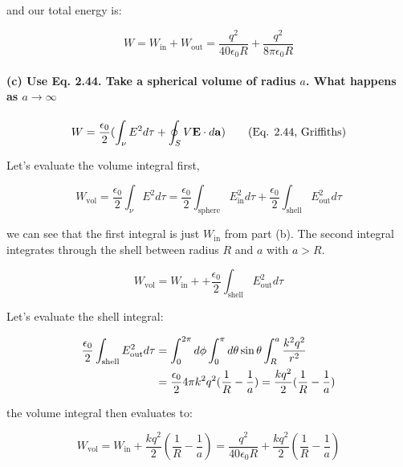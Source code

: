 \documentclass{article}
\numberwithin{equation}{section}
\numberwithin{figure}{section}
\begin{document}
and our total energy is:

\begin{equation}
    W = W_\text{in} + W_\text{out} = \frac{q^2}{40 \epsilon_0 R}+ \frac{q^2}{8 \pi \epsilon_0 R }
\end{equation}

\paragraph{(c) Use Eq. 2.44. Take a spherical volume of radius $a$. What happens as $a \to \infty$}

\begin{equation*}
    W = {\epsilon_0 \over 2} ( \int_\nu E^2 d \tau + \oint_S V \vb E \cdot d \vb a ) \tag{Eq. 2.44, Griffiths}  
\end{equation*}

Let's evaluate the volume integral first,

\begin{equation}
    W_{\text{vol}} = \frac{\epsilon_0}{2} \int_\nu E^2 d \tau = \frac{\epsilon_0}{2} \int_\text{sphere} E_\text{in}^2 d \tau + \frac{\epsilon_0}{2} \int_\text{shell} E_\text{out}^2 d \tau
\end{equation}

we can see that the first integral is just $W_\text{in}$ from part (b). The second integral integrates through the shell between radius $R$ and $a$ with $a > R$.

\begin{equation}
    W_{\text{vol}} = W_\text{in} + + \frac{\epsilon_0}{2} \int_\text{shell} E_\text{out}^2 d \tau
\end{equation}

Let's evaluate the shell integral:

\begin{equation}
\begin{split}
        \frac{\epsilon_0}{2} \int_\text{shell} E_\text{out}^2 d \tau &= \int_0^{2\pi} d\phi \int_0^\pi d \theta \sin \theta \int_R^a {k^2 q^2 \over r^2} \\
        &= \frac{\epsilon_0}{2} 4\pi k^2 q^2 (\frac{1}{R} - \frac{1}{a}) = \frac{kq^2}{2} (\frac{1}{R} - \frac{1}{a})
\end{split}
\end{equation}

the volume integral then evaluates to:

\begin{equation}
    W_\text{vol} = W_\text{in} + \frac{kq^2}{2} (\frac{1}{R} - \frac{1}{a}) = \frac{q^2}{40 \epsilon_0 R} + \frac{kq^2}{2} (\frac{1}{R} - \frac{1}{a})
\end{equation}
\end{document}
